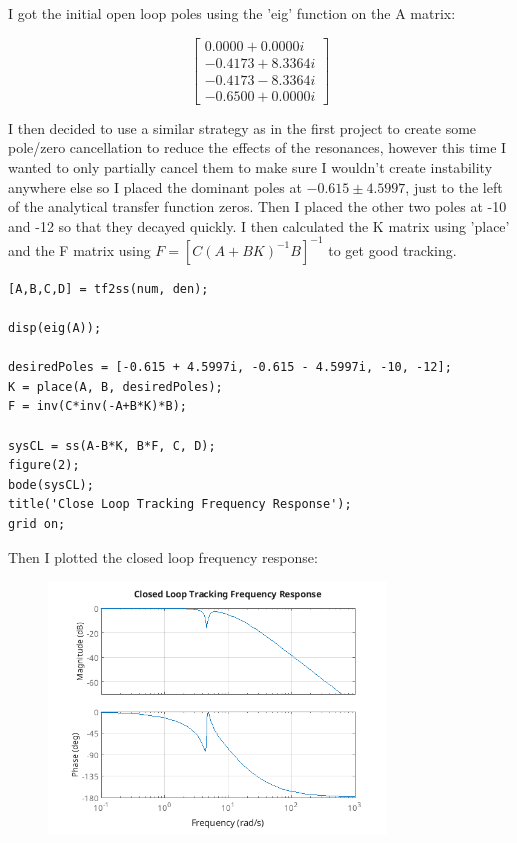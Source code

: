 \documentclass{article}
\begin{document}
I got the initial open loop poles using the 'eig' function on the A matrix:

\[
\begin{bmatrix}
0.0000 + 0.0000i \\
-0.4173 + 8.3364i \\
-0.4173 - 8.3364i \\
-0.6500 + 0.0000i
\end{bmatrix}
\]

I then decided to use a similar strategy as in the first project to create some pole/zero cancellation to reduce the effects of the resonances, however this time I wanted to only partially cancel them to make sure I wouldn't create instability anywhere else so I placed the dominant poles at $-0.615 \pm 4.5997$, just to the left of the analytical transfer function zeros.
Then I placed the other two poles at -10 and -12 so that they decayed quickly.
I then calculated the K matrix using 'place' and the F matrix using $F = \left[ C (A + B K)^{-1} B \right]^{-1}$ to get good tracking.

\begin{lstlisting}[style=matlabstyle]
[A,B,C,D] = tf2ss(num, den);

disp(eig(A));

desiredPoles = [-0.615 + 4.5997i, -0.615 - 4.5997i, -10, -12];
K = place(A, B, desiredPoles);
F = inv(C*inv(-A+B*K)*B);

sysCL = ss(A-B*K, B*F, C, D);
figure(2);
bode(sysCL);
title('Close Loop Tracking Frequency Response');
grid on;    
\end{lstlisting}

Then I plotted the closed loop frequency response:

\begin{figure}[H]
\centering
\includegraphics[width=0.8\textwidth]{clFreqResp.png}
\label{fig:clFreqResp}
\end{figure}
\end{document}
